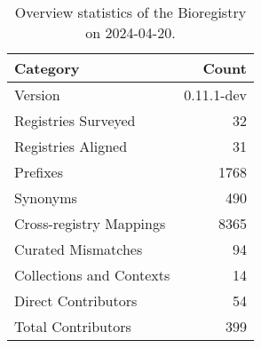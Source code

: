 \begin{table}
\caption{Overview statistics of the Bioregistry on 2024-04-20.}
\label{tab:bioregistry-summary}
\begin{tabular}{lr}
\toprule
Category & Count \\
\midrule
Version & 0.11.1-dev \\
Registries Surveyed & 32 \\
Registries Aligned & 31 \\
Prefixes & 1768 \\
Synonyms & 490 \\
Cross-registry Mappings & 8365 \\
Curated Mismatches & 94 \\
Collections and Contexts & 14 \\
Direct Contributors & 54 \\
Total Contributors & 399 \\
\bottomrule
\end{tabular}
\end{table}
